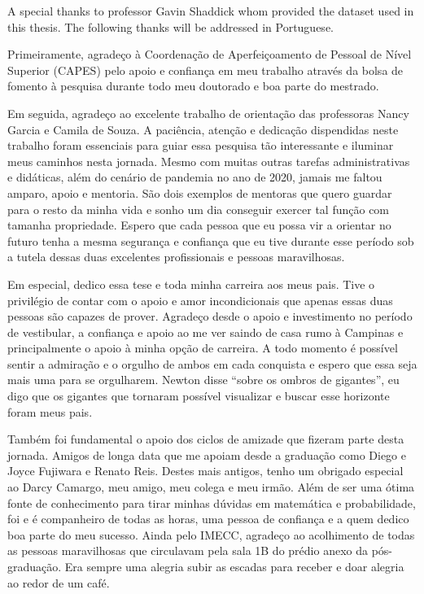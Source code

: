   A special thanks to professor Gavin Shaddick whom provided the dataset used in this thesis.
  The following thanks will be addressed in Portuguese.

  Primeiramente, agradeço à Coordenação de Aperfeiçoamento de Pessoal de Nível Superior (CAPES) pelo apoio e confiança em meu trabalho através da bolsa de fomento à pesquisa durante todo meu doutorado e boa parte do mestrado.

  Em seguida, agradeço ao excelente trabalho de orientação das professoras Nancy Garcia e Camila de Souza. A paciência, atenção e dedicação dispendidas neste trabalho foram essenciais para guiar essa pesquisa tão interessante e iluminar meus caminhos nesta jornada. Mesmo com muitas outras tarefas administrativas e didáticas, além do cenário de pandemia no ano de 2020, jamais me faltou amparo, apoio e mentoria. São dois exemplos de mentoras que quero guardar para o resto da minha vida e sonho um dia conseguir exercer tal função com tamanha propriedade. Espero que cada pessoa que eu possa vir a orientar no futuro tenha a mesma segurança e confiança que eu tive durante esse período sob a tutela dessas duas excelentes profissionais e pessoas maravilhosas.

  Em especial, dedico essa tese e toda minha carreira aos meus pais. Tive o privilégio de contar com o apoio e amor incondicionais que apenas essas duas pessoas são capazes de prover. Agradeço desde o apoio e investimento no período de vestibular, a confiança e apoio ao me ver saindo de casa rumo à Campinas e principalmente o apoio à minha opção de carreira. A todo momento é possível sentir a admiração e o orgulho de ambos em cada conquista e espero que essa seja mais uma para se orgulharem. Newton disse ``sobre os ombros de gigantes'', eu digo que os gigantes que tornaram possível visualizar e buscar esse horizonte foram meus pais.

  Também foi fundamental o apoio dos ciclos de amizade que fizeram parte desta jornada. Amigos de longa data que me apoiam desde a graduação como Diego e Joyce Fujiwara e Renato Reis. Destes mais antigos, tenho um obrigado especial ao Darcy Camargo, meu amigo, meu colega e meu irmão. Além de ser uma ótima fonte de conhecimento para tirar minhas dúvidas em matemática e probabilidade, foi e é companheiro de todas as horas, uma pessoa de confiança e a quem dedico boa parte do meu sucesso. Ainda pelo IMECC, agradeço ao acolhimento de todas as pessoas maravilhosas que circulavam pela sala 1B do prédio anexo da pós-graduação. Era sempre uma alegria subir as escadas para receber e doar alegria ao redor de um café.

